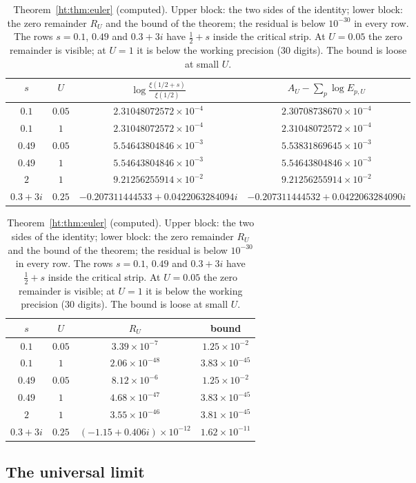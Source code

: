 \begin{table}[ht]
\centering\scriptsize\setlength{\tabcolsep}{3pt}
\begin{tabular}{cccc}
\toprule
$s$ & $U$ & $\log\frac{\xi(1/2+s)}{\xi(1/2)}$ & $A_U-\sum_p\log E_{p,U}$ \\
\midrule
$0.1$ & $0.05$ & $2.31048072572\times10^{-4}$ & $2.30708738670\times10^{-4}$ \\
$0.1$ & $1$ & $2.31048072572\times10^{-4}$ & $2.31048072572\times10^{-4}$ \\
$0.49$ & $0.05$ & $5.54643804846\times10^{-3}$ & $5.53831869645\times10^{-3}$ \\
$0.49$ & $1$ & $5.54643804846\times10^{-3}$ & $5.54643804846\times10^{-3}$ \\
$2$ & $1$ & $9.21256255914\times10^{-2}$ & $9.21256255914\times10^{-2}$ \\
$0.3+3i$ & $0.25$ & $-0.207311444533+0.0422063284094i$ & $-0.207311444532+0.0422063284090i$ \\
\bottomrule
\end{tabular}

\medskip
\begin{tabular}{cccc}
\toprule
$s$ & $U$ & $R_U$ & bound \\
\midrule
$0.1$ & $0.05$ & $3.39\times10^{-7}$ & $1.25\times10^{-2}$ \\
$0.1$ & $1$ & $2.06\times10^{-48}$ & $3.83\times10^{-45}$ \\
$0.49$ & $0.05$ & $8.12\times10^{-6}$ & $1.25\times10^{-2}$ \\
$0.49$ & $1$ & $4.68\times10^{-47}$ & $3.83\times10^{-45}$ \\
$2$ & $1$ & $3.55\times10^{-46}$ & $3.81\times10^{-45}$ \\
$0.3+3i$ & $0.25$ & $(-1.15+0.406i)\times10^{-12}$ & $1.62\times10^{-11}$ \\
\bottomrule
\end{tabular}
\caption{Theorem~\ref{ht:thm:euler} (computed). Upper block: the two sides of the identity; lower block: the zero remainder $R_U$ and the bound of the theorem; the residual is below $10^{-30}$ in every row. The rows $s=0.1$, $0.49$ and $0.3+3i$ have $\frac12+s$ inside the critical strip. At $U=0.05$ the zero remainder is visible; at $U=1$ it is below the working precision ($30$ digits). The bound is loose at small $U$.}\label{ht:tab:euler}
\end{table}

\subsection{The universal limit}

